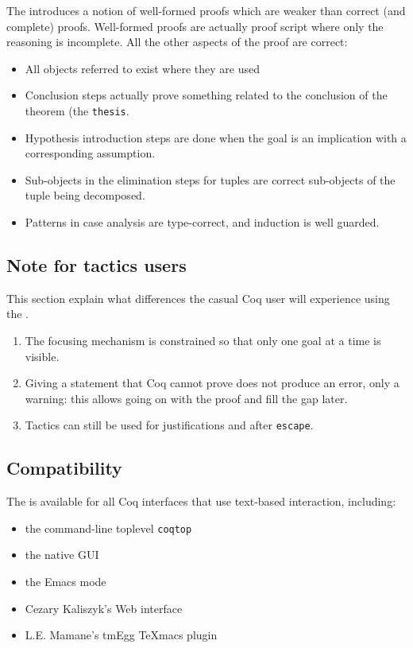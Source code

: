 The \DPL{} introduces a notion of well-formed
proofs which are weaker than correct (and complete)
proofs. Well-formed proofs are actually proof script where only the
reasoning is incomplete. All the other aspects of the proof are
correct:
\begin{itemize}
\item All objects referred to exist where they are used
\item Conclusion steps actually prove something related to the
  conclusion of the theorem (the {\tt thesis}.
\item Hypothesis introduction steps are done when the goal is an
  implication with a corresponding assumption.
\item Sub-objects in the elimination steps for tuples are correct
  sub-objects of the tuple being decomposed.
\item Patterns in case analysis are type-correct, and induction is well guarded.
\end{itemize}

\subsection{Note for tactics users}

This section explain what differences the casual Coq user will
experience using the \DPL .
\begin{enumerate}
\item The focusing mechanism is constrained so that only one goal at
  a time is visible.
\item Giving a statement that Coq cannot prove does not produce an
  error, only a warning: this allows going on with the proof and fill
  the gap later.
\item Tactics can still be used for justifications and after
{\texttt{escape}}.
\end{enumerate}

\subsection{Compatibility}

The \DPL{} is available for all Coq interfaces that use
text-based interaction, including:
\begin{itemize}
\item the command-{}line toplevel {\texttt{coqtop}}
\item the native GUI {\CoqIDE}
\item the {\ProofGeneral} Emacs mode
\item Cezary Kaliszyk'{}s Web interface
\item L.E. Mamane'{}s tmEgg TeXmacs plugin
\end{itemize}

